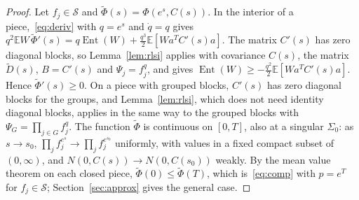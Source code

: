 \documentclass[11pt]{amsart}
\theoremstyle{definition}
\newcommand{\E}{\mathbb{E}}
\newcommand{\Ent}{\operatorname{Ent}}
\newcommand{\cS}{\mathcal{S}}
\begin{document}
\begin{proof}
Let $f_j\in\cS$ and $\tilde\Phi(s)=\Phi(e^s,C(s))$. In the interior of a piece,~\eqref{eq:deriv} with $q=e^s$ and
$\dot q=q$ gives $q^2\E W\,\tilde\Phi'(s)=q\Ent(W)+\frac{q^3}2\E[Wa^TC'(s)a]$. The matrix $C'(s)$ has zero diagonal
blocks, so Lemma~\ref{lem:rlsi} applies with covariance $C(s)$, the matrix $\tilde D(s)$, $B=C'(s)$ and
$\Psi_j=f_j^q$, and gives $\Ent(W)\ge-\frac{q^2}2\E[Wa^TC'(s)a]$. Hence $\tilde\Phi'(s)\ge0$. On a piece with grouped
blocks, $C'(s)$ has zero diagonal blocks for the groups, and Lemma~\ref{lem:rlsi}, which does not need identity
diagonal blocks, applies in the same way to the grouped blocks with $\Psi_G=\prod_{j\in G}f_j^q$. The function
$\tilde\Phi$ is continuous on $[0,T]$, also at a singular $\Sigma_0$: as $s\to s_0$, $\prod_jf_j^{e^s}\to\prod_jf_j^{e^{s_0}}$
uniformly, with values in a fixed compact subset of $(0,\infty)$, and $N(0,C(s))\to N(0,C(s_0))$ weakly. By the mean
value theorem on each closed piece, $\tilde\Phi(0)\le\tilde\Phi(T)$, which is~\eqref{eq:comp} with $p=e^T$ for
$f_j\in\cS$; Section~\ref{sec:approx} gives the general case.
\end{proof}
\end{document}
